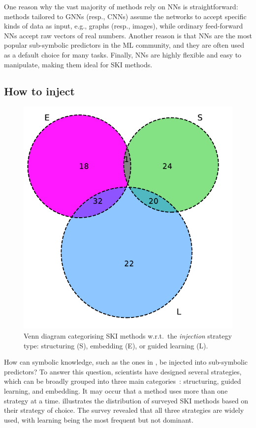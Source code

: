 One reason why the vast majority of methods rely on \glspl{NN} is straightforward: methods tailored to \glspl{GNN} (resp., \glspl{CNN}) assume the networks to accept specific kinds of data as input, e.g., graphs (resp., images), while ordinary feed-forward \glspl{NN} accept raw vectors of real numbers.
%
Another reason is that \glspl{NN} are the most popular sub-symbolic predictors in the \gls{ML} community, and they are often used as a default choice for many tasks.
%
Finally, \glspl{NN} are highly flexible and easy to manipulate, making them ideal for \gls{SKI} methods.


\subsection{How to inject}\label{subsec:how-to-inject}
%
\begin{figure}
    \centering
    \includegraphics[width=.4\linewidth]{figures/ski-integration}
    \caption[Venn diagram categorising SKI methods]{
        Venn diagram categorising SKI methods w.r.t.\ the \emph{injection} strategy type: structuring (S), embedding (E), or guided learning (L).
    }
    \label{fig:pie-ski-injection}
\end{figure}
%
How can symbolic knowledge, such as the ones in , be injected into sub-symbolic predictors?
%
To answer this question, scientists have designed several strategies, which can be broadly grouped into three main categories~\cite{DBLP:journals/csur/CiattoSAMO24}: structuring, guided learning, and embedding.
%
It may occur that a method uses more than one strategy at a time.
%
 illustrates the distribution of surveyed \gls{SKI} methods based on their strategy of choice.
%
The survey revealed that all three strategies are widely used, with learning being the most frequent but not dominant.

